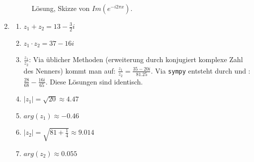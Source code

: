 \begin{enumerate}
\begin{figure}[H]
    \centering
    
    \caption{Lösung, Skizze von $Im(e^{-i2\pi x})$.}
    \label{fig:Loes_K3_4}
\end{figure}

\item 
    \begin{enumerate}
        \item $z_1 + z_2 = 13 - \frac{3}{2} i $
        \item $z_1 \cdot z_2 =  37 -16i$
        \item $\frac{z_1}{z_2}$: Via üblicher Methoden (erweiterung durch konjugiert komplexe Zahl des Nenners) kommt man auf: $\frac{z_1}{z_2} = \frac{35-20i}{81.25}$. Via \texttt{sympy} entsteht durch  und : $\frac{28}{68} - \frac{16i}{65}$. Diese Lösungen sind identisch. 
        \item $|z_1| = \sqrt{20} \approx 4.47$
        \item $arg(z_1) \approx -0.46$
        \item $|z_2| = \sqrt{81 + \frac{1}{4}} \approx 9.014$
        \item $arg(z_2) \approx 0.055$
    \end{enumerate}
\end{enumerate}

